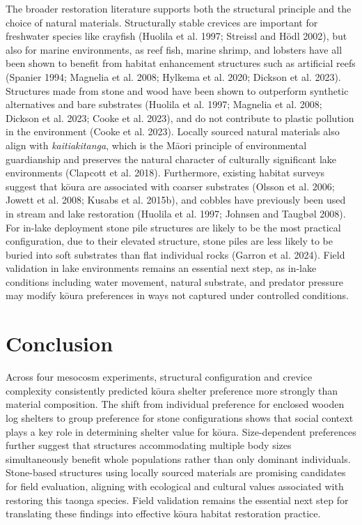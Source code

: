 \documentclass[
  12pt,
  a4paper,
]{scrbook}
\begin{document}
The broader restoration literature supports both the structural
principle and the choice of natural materials. Structurally stable
crevices are important for freshwater species like crayfish (Huolila et
al. 1997; Streissl and Hödl 2002), but also for marine environments, as
reef fish, marine shrimp, and lobsters have all been shown to benefit
from habitat enhancement structures such as artificial reefs (Spanier
1994; Magnelia et al. 2008; Hylkema et al. 2020; Dickson et al. 2023).
Structures made from stone and wood have been shown to outperform
synthetic alternatives and bare substrates (Huolila et al. 1997;
Magnelia et al. 2008; Dickson et al. 2023; Cooke et al. 2023), and do
not contribute to plastic pollution in the environment (Cooke et al.
2023). Locally sourced natural materials also align with
\emph{kaitiakitanga}, which is the Māori principle of environmental
guardianship and preserves the natural character of culturally
significant lake environments (Clapcott et al. 2018). Furthermore,
existing habitat surveys suggest that kōura are associated with coarser
substrates (Olsson et al. 2006; Jowett et al. 2008; Kusabs et al.
2015b), and cobbles have previously been used in stream and lake
restoration (Huolila et al. 1997; Johnsen and Taugbøl 2008). For in-lake
deployment stone pile structures are likely to be the most practical
configuration, due to their elevated structure, stone piles are less
likely to be buried into soft substrates than flat individual rocks
(Garron et al. 2024). Field validation in lake environments remains an
essential next step, as in-lake conditions including water movement,
natural substrate, and predator pressure may modify kōura preferences in
ways not captured under controlled conditions.

\section{Conclusion}\label{conclusion}

Across four mesocosm experiments, structural configuration and crevice
complexity consistently predicted kōura shelter preference more strongly
than material composition. The shift from individual preference for
enclosed wooden log shelters to group preference for stone
configurations shows that social context plays a key role in determining
shelter value for kōura. Size-dependent preferences further suggest that
structures accommodating multiple body sizes simultaneously benefit
whole populations rather than only dominant individuals. Stone-based
structures using locally sourced materials are promising candidates for
field evaluation, aligning with ecological and cultural values
associated with restoring this taonga species. Field validation remains
the essential next step for translating these findings into effective
kōura habitat restoration practice.
\end{document}
